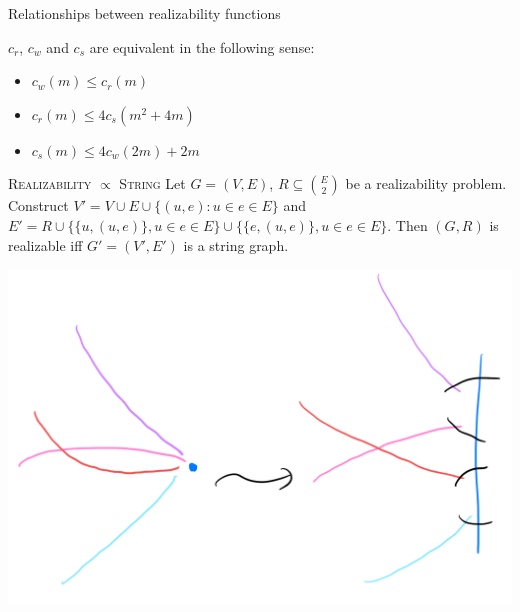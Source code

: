\documentclass[10pt,aspectratio=169]{beamer}
\theoremstyle{plain}
\newcommand{\set}[1]{\{#1\}}
\begin{document}
\begin{frame}{Relationships between realizability functions}
    \begin{lemma}
        \(c_r\), \(c_w\) and \(c_s\) are equivalent in the following sense:
        \begin{itemize}
            \item \(c_w(m) \leq c_r(m)\)
            \item \(c_r(m) \leq 4 c_s(m^2 + 4m)\)
            \item \(c_s(m) \leq 4 c_w(2m) + 2m\)
        \end{itemize}
        \label{lem:pol-equivalent}
    \end{lemma}
\end{frame}

\begin{frame}{\textsc{Realizability} \(\propto\) \textsc{String}}
    Let \(G = (V, E)\), \(R \subseteq \binom{E}{2}\) be a realizability problem.\pause
    Construct \(V' = V \cup E \cup \set{(u, e) : u \in e \in E}\) 
    and \(E' = R \cup \set{ \set{u, (u,e)}, u \in e \in E} \cup \set{\set{e, (u,e)}, u\in e \in E}\). \pause
    Then \((G, R)\) is realizable iff \(G' = (V', E')\) is a string graph.
    \begin{center}
        \includegraphics[height=0.6\textheight]{images/figure-2.pdf}
    \end{center}
\end{frame}
\end{document}
